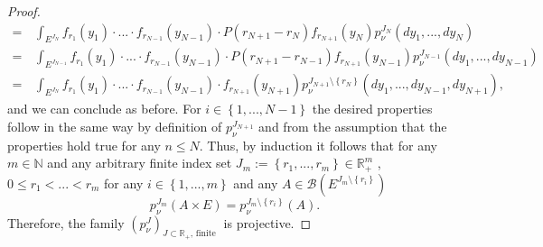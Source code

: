 \documentclass[a4paper,12pt]{article}
\theoremstyle{definition}
\theoremstyle{remark}
\numberwithin{equation}{section}
\numberwithin{theorem}{section}
\begin{document}
\begin{proof}
\begin{align*}
 =& \,\int_{{E^{J_{N}}}}f_{r_{1}}(y_{1})\cdot...\cdot f_{r_{N-1}}(y_{N-1})\cdot P(r_{N+1}-r_{N})f_{r_{N+1}}(y_{N})p_{\nu}^{J_{N}}(dy_{1},...,dy_{N})\\
 =& \,\int_{E^{J_{N-1}}}f_{r_{1}}(y_{1})\cdot...\cdot f_{r_{N-1}}(y_{N-1})\cdot P(r_{N+1}-r_{N-1})f_{r_{N+1}}(y_{N-1})p_{\nu}^{J_{N-1}}(dy_{1},...,dy_{N-1})\\
 =& \,\int_{{E^{J_{N}}}}f_{r_{1}}(y_{1})\cdot...\cdot f_{r_{N-1}}(y_{N-1})\cdot f_{r_{N+1}}(y_{N+1})p_{\nu}^{J_{N+1}\setminus\left\{ r_{N}\right\} }(dy_{1},...,dy_{N-1},dy_{N+1}),
\end{align*}
and we can conclude as before. 
For $i\in\left\{ 1,...,N-1\right\} $ the desired properties follow
in the same way by definition of $p_{\nu}^{J_{N+1}}$  and from the assumption that the properties
hold true for any $n\leq N$. 
Thus, by induction it follows that for any $m\in\mathbb{N}$ and any
arbitrary finite index set $J_{m}:=\left\{ r_{1},...,r_{m}\right\} \in\mathbb{R}_{+}^{m}$
, $0\leq r_{1}<...<r_{m}$ for any $i\in\left\{ 1,...,m\right\} $
and any $A\in\mathcal{B}\left(E^{J_{m}\setminus\left\{ r_{i}\right\} }\right)$
\[
p_{\nu}^{J_{m}}(A\times E)=p_{\nu}^{J_{m}\setminus\left\{ r_{i}\right\} }(A).
\]
Therefore, the family 
$
\left(p_{\nu}^{J}\right)_{J\subset\mathbb{R}_{+},\,\text{finite }}$ 
 is projective. 
 

\end{proof}
\end{document}
